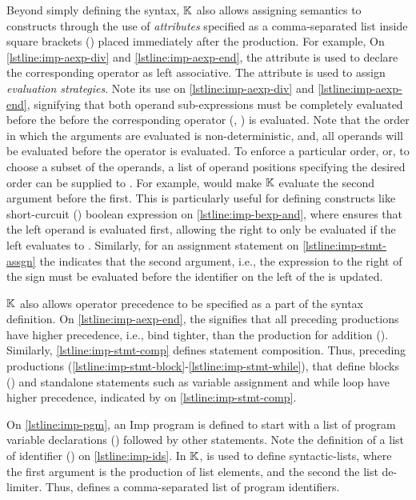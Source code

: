 Beyond simply defining the syntax, $\mathbb{K}{}$ also allows assigning semantics to
constructs through the use of \emph{attributes} specified as a comma-separated list
inside square brackets (\inlinek{[..]}) placed immediately after the \BNF{} production.
For example, On \autoref{lstline:imp-aexp-div} and \autoref{lstline:imp-aexp-end},
the attribute  is used to declare the
corresponding operator as left associative. The  attribute is used
to assign \emph{evaluation strategies}. Note its use
on \autoref{lstline:imp-aexp-div} and \autoref{lstline:imp-aexp-end}, signifying
that both operand sub-expressions must be completely evaluated before the
before the corresponding operator (\inlinek{/}, \inlinek{+}) is evaluated.
Note that the order in which the arguments are evaluated is non-deterministic,
and, all operands will be evaluated before the operator is evaluated.
To enforce a particular order, or, to choose a subset of the operands, a
list of operand positions specifying the desired order can be supplied to
. For example,  would make $\mathbb{K}$
evaluate the second argument before the first. This is particularly
useful for defining constructs like short-curcuit (\inlineimp{&&}) boolean
expression on \autoref{lstline:imp-bexp-and}, where 
ensures that the left operand is evaluated first, allowing the right to only
be evaluated if the left evaluates to .
Similarly, for an assignment statement on \autoref{lstline:imp-stmt-assgn}
the  indicates that the second argument, i.e., the
expression to the right of the \inlineimp{=} sign must be evaluated before
the identifier on the left of the \inlineimp{=} is updated.

$\mathbb{K}{}$ also allows operator precedence to be specified as a part of the
syntax definition. On \autoref{lstline:imp-aexp-end},
the \inlinek{>} signifies that all preceding productions have higher precedence,
i.e., bind tighter, than the production for addition (\inlinek{+}).
Similarly, \autoref{lstline:imp-stmt-comp} defines statement composition.
Thus, preceding  productions
(\autoref{lstline:imp-stmt-block}-\autoref{lstline:imp-stmt-while}), that define
blocks () and standalone statements such as variable assignment and
while loop have higher precedence, indicated by \inlinek{>} on \autoref{lstline:imp-stmt-comp}.

On \autoref{lstline:imp-pgm}, an Imp program is defined to start with a list of program variable
declarations () followed by other statements. Note the
definition of a list of identifier () on \autoref{lstline:imp-ids}. In $\mathbb{K}{}$,
 is used to define syntactic-lists, where the first
argument is the production of list elements, and the second the list de-limiter.
Thus,  defines a comma-separated list of program identifiers.

